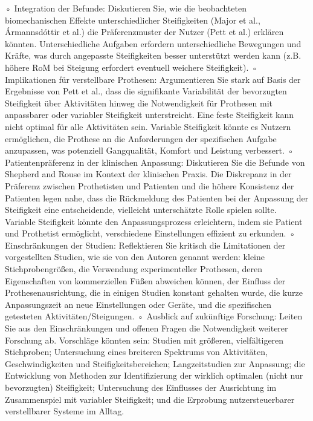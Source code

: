 ◦
Integration der Befunde: Diskutieren Sie, wie die beobachteten biomechanischen Effekte unterschiedlicher Steifigkeiten (Major et al., Ármannsdóttir et al.) die Präferenzmuster der Nutzer (Pett et al.) erklären könnten. Unterschiedliche Aufgaben erfordern unterschiedliche Bewegungen und Kräfte, was durch angepasste Steifigkeiten besser unterstützt werden kann (z.B. höhere RoM bei Steigung erfordert eventuell weichere Steifigkeit).
◦
Implikationen für verstellbare Prothesen: Argumentieren Sie stark auf Basis der Ergebnisse von Pett et al., dass die signifikante Variabilität der bevorzugten Steifigkeit über Aktivitäten hinweg die Notwendigkeit für Prothesen mit anpassbarer oder variabler Steifigkeit unterstreicht. Eine feste Steifigkeit kann nicht optimal für alle Aktivitäten sein. Variable Steifigkeit könnte es Nutzern ermöglichen, die Prothese an die Anforderungen der spezifischen Aufgabe anzupassen, was potenziell Gangqualität, Komfort und Leistung verbessert.
◦
Patientenpräferenz in der klinischen Anpassung: Diskutieren Sie die Befunde von Shepherd and Rouse im Kontext der klinischen Praxis. Die Diskrepanz in der Präferenz zwischen Prothetisten und Patienten und die höhere Konsistenz der Patienten legen nahe, dass die Rückmeldung des Patienten bei der Anpassung der Steifigkeit eine entscheidende, vielleicht unterschätzte Rolle spielen sollte. Variable Steifigkeit könnte den Anpassungsprozess erleichtern, indem sie Patient und Prothetist ermöglicht, verschiedene Einstellungen effizient zu erkunden.
◦
Einschränkungen der Studien: Reflektieren Sie kritisch die Limitationen der vorgestellten Studien, wie sie von den Autoren genannt werden: kleine Stichprobengrößen, die Verwendung experimenteller Prothesen, deren Eigenschaften von kommerziellen Füßen abweichen können, der Einfluss der Prothesenausrichtung, die in einigen Studien konstant gehalten wurde, die kurze Anpassungszeit an neue Einstellungen oder Geräte, und die spezifischen getesteten Aktivitäten/Steigungen.
◦
Ausblick auf zukünftige Forschung: Leiten Sie aus den Einschränkungen und offenen Fragen die Notwendigkeit weiterer Forschung ab. Vorschläge könnten sein: Studien mit größeren, vielfältigeren Stichproben; Untersuchung eines breiteren Spektrums von Aktivitäten, Geschwindigkeiten und Steifigkeitsbereichen; Langzeitstudien zur Anpassung; die Entwicklung von Methoden zur Identifizierung der wirklich optimalen (nicht nur bevorzugten) Steifigkeit; Untersuchung des Einflusses der Ausrichtung im Zusammenspiel mit variabler Steifigkeit; und die Erprobung nutzersteuerbarer verstellbarer Systeme im Alltag.
